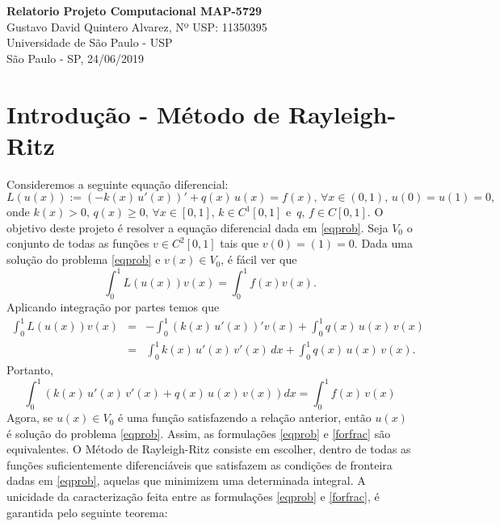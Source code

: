 \documentclass[12pt,a4paper]{report}
\newcommand{\dis}{\displaystyle}
\begin{document}
\begin{center}
{\LARGE\bf Relatorio Projeto Computacional MAP-5729}\medskip\\
\large{Gustavo David Quintero Alvarez, Nº USP: 11350395\\
Universidade de São Paulo - USP\\
São Paulo - SP, 24/06/2019}
\end{center}\vspace*{1cm}
\section*{Introdução - Método de Rayleigh-Ritz}
Consideremos a seguinte equação diferencial:
\begin{equation}\label{eqprob}
L(u(x)):=\left(-k(x)\,u'(x)\right)' + q(x)\,u(x) = f(x),\, \forall x\in (0,1),\, u(0)=u(1)=0,
\end{equation}
onde $k(x)>0,\, q(x)\geq 0,\,\forall x\in [0,1],\,k\in C^1[0,1]$ e $\,q,\,f\in C[0,1]$. O objetivo deste projeto é resolver a equação diferencial dada em \eqref{eqprob}. Seja $V_0$ o conjunto de todas as funções $v\in C^2[0,1]$ tais que $v(0)=(1)=0$. Dada uma solução do problema \eqref{eqprob} e $v(x)\in V_0$, é fácil ver que $$\dis\int_0^1 L(u(x))v(x)=\dis\int_0^1f(x)v(x).$$ Aplicando integração por partes temos que 
\begin{eqnarray*}
\dis\int_0^1 L(u(x))v(x) &=& -\dis\int_0^1(k(x)\,u'(x))'v(x) + \dis\int_0^1 q(x)\,u(x)\,v(x)  \\
&=& \dis\int_0^1 k(x)\,u'(x)\,v'(x)\,dx + \dis\int_0^1 q(x)\,u(x)\,v(x).
\end{eqnarray*}
Portanto,
\begin{equation}\label{forfrac}
\dis\int_0^1 \left(k(x)\,u'(x)\,v'(x)+q(x)\,u(x)\,v(x)\right)dx = \dis\int_0^1f(x)\,v(x)
\end{equation}
Agora, se $u(x)\in V_0$ é uma função satisfazendo a relação anterior, então $u(x)$ é solução do problema \eqref{eqprob}. Assim, as formulações \eqref{eqprob} e \eqref{forfrac} são equivalentes.
O Método de Rayleigh-Ritz consiste em escolher, dentro de todas as funções suficientemente diferenciáveis que satisfazem as condições de fronteira dadas em \eqref{eqprob}, aquelas que minimizem uma determinada integral. A unicidade da caracterização feita entre as formulações \eqref{eqprob} e \eqref{forfrac}, é garantida pelo seguinte teorema:
\end{document}
